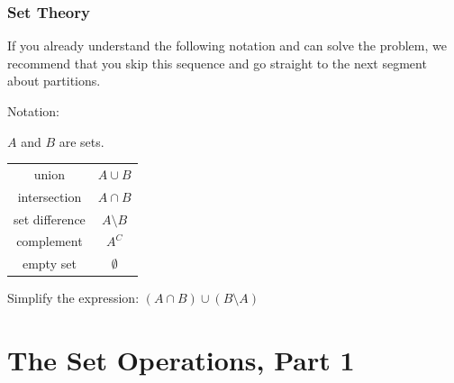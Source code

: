 \documentclass[12pt, block=fill]{beamer}
\newcommand{\paul}[1]{\textcolor{red}{#1}}
\begin{document}


\begin{frame}
  \frametitle{Set Theory}
  
  
  If you already understand the following notation and can solve the
  problem, we recommend that you skip this sequence and go straight to
  the next segment about partitions. 
  
  Notation:
  
  $A$ and $B$ are sets.
  
  \begin{tabular}{c|c}
    union & $A \cup B$ \\
    intersection & $ A \cap B$ \\
    set difference & $A \setminus B$\\
    complement & $A^C$ \\
    empty set & $\emptyset$ \\
  \end{tabular}
  
  
  Simplify the expression: $ (A \cap B) \cup ( B \setminus A) $
\end{frame}


\section{The Set Operations, Part 1}
\end{document}
